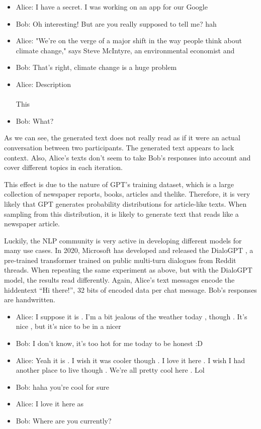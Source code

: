 \begin{example}
\leavevmode
\begin{itemize}
\item Alice: I have a secret. I was working on an app for our Google
\item Bob:   Oh interesting! But are you really supposed to tell me? hah
\item Alice: "We're on the verge of a major shift in the way people think about climate change," says Steve McIntyre, an environmental economist and
\item Bob:   That's right, climate change is a huge problem
\item Alice: Description \\
\\
       This
\item Bob:   What?
\end{itemize}
\end{example}

As we can see, the generated text does not really read as if it were an actual conversation between two participants.
The generated text appears to lack context.
Also, Alice's texts don't seem to take Bob's responses into account and cover different topics in each iteration.

This effect is due to the nature of GPT's training dataset, which is a large collection of newspaper reports, books, articles and thelike.
Therefore, it is very likely that GPT generates probability distributions for article-like texts.
When sampling from this distribution, it is likely to generate text that reads like a newspaper article.

Luckily, the NLP community is very active in developing different models for many use cases.
In 2020, Microsoft has developed and released the DialoGPT \cite{Zhang2020}, a pre-trained transformer trained on public multi-turn dialogues from Reddit threads.
When repeating the same experiment as above, but with the DialoGPT model, the results read differently.
Again, Alice's text messages encode the hiddentext ``Hi there!'', 32 bits of encoded data per chat message.
Bob's responses are handwritten.

\begin{example}
\leavevmode
\begin{itemize}
\item Alice: I suppose it is . I'm a bit jealous of the weather today , though . It's nice , but it's nice to be in a nicer
\item Bob:   I don't know, it's too hot for me today to be honest :D
\item Alice: Yeah it is . I wish it was cooler though . I love it here . I wish I had another place to live though . We're all pretty cool here . Lol
\item Bob:   haha you're cool for sure
\item Alice: I love it here as
\item Bob:   Where are you currently?
\end{itemize}


\end{example}